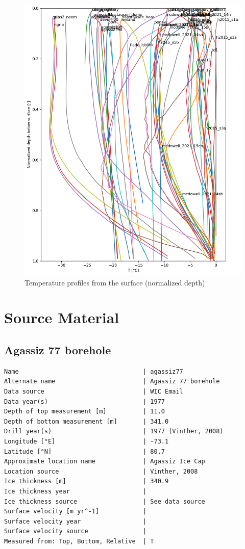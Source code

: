 \documentclass[article,a4paper,times,11pt,twoside]{article}
\begin{document}
\begin{figure}[!h]
\centering
\includegraphics[width=.9\linewidth]{./T_norm.png}
\caption{\label{fig:T_norm}Temperature profiles from the surface (normalized depth)}
\end{figure}

\clearpage
\section{Source Material}
\label{sec:org17ccb2d}
\subsection{Agassiz 77 borehole}
\label{sec:orgcb37349}
\begin{verbatim}
Name                                  | agassiz77
Alternate name                        | Agassiz 77 borehole 
Data source                           | WIC Email
Data year(s)                          | 1977
Depth of top measurement [m]          | 11.0 
Depth of bottom measurement [m]       | 341.0 
Drill year(s)                         | 1977 (Vinther, 2008)
Longitude [°E]                        | -73.1 
Latitude [°N]                         | 80.7 
Approximate location name             | Agassiz Ice Cap 
Location source                       | Vinther, 2008
Ice thickness [m]                     | 340.9 
Ice thickness year                    | 
Ice thickness source                  | See data source 
Surface velocity [m yr^-1]            | 
Surface velocity year                 | 
Surface velocity source               | 
Measured from: Top, Bottom, Relative  | T 
\end{verbatim}
\end{document}
